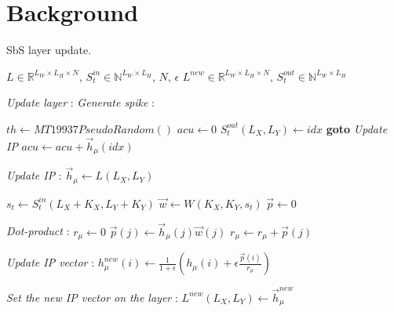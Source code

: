 \section{Background}
\label{sec:background}



\begin{algorithm}
\caption{SbS layer update.}

\begin{algorithmic}[1]
	\SetAlgoLined
	\renewcommand{\algorithmicrequire}{\textbf{input:}}
	\renewcommand{\algorithmicensure}{\textbf{output:}}
	\REQUIRE $L\in\mathbb{R}^{L_W \times L_H \times N}$, $S_t^{in}\in\mathbb{N}^{ L_W \times L_H}$, $N$, $\epsilon$
	\ENSURE $L^{new}\in\mathbb{R}^{L_W\times L_H \times N}$, $S_t^{out} \in\mathbb{N}^{L_W\times L_H}$
	
	\textit{Update layer} :
		\textit{Generate spike} :
		
		\STATE $th \leftarrow MT19937PseudoRandom()$
		\STATE $acu \leftarrow 0$
				\STATE $S_t^{out}(L_X,L_Y) \leftarrow idx$
				\STATE \textbf{goto} \emph{Update IP}
			\ENDIF
			\STATE $acu \leftarrow acu + \vec{h}_{\mu}(idx)$
		\ENDFOR

		\textit{Update IP} :
		\STATE $\vec{h}_\mu \leftarrow L(L_X,L_Y)$ 
		
			\STATE $s_t \leftarrow S_t^{in}(L_X+K_X,L_Y+K_Y)$
			\STATE $\vec{w} \leftarrow W(K_X,K_Y,s_t)$
			\STATE $\vec{p} \leftarrow 0$
			
			\textit{Dot-product} :
			\STATE $r_{\mu} \leftarrow 0$
				\STATE $\vec{p}(j) \leftarrow \vec{h}_{\mu}(j)\vec{w}(j)$
				\STATE $r_{\mu} \leftarrow r_{\mu} + \vec{p}(j)$
			\ENDFOR
			
			
				\textit{Update IP vector} :
				\STATE
				$  h_\mu^{new}(i) \leftarrow \frac{1}{1+\epsilon} \left(h_\mu(i) + \epsilon \frac{\vec{p}(i) }{r_{\mu}} \right) $
				\ENDFOR

				\textit{Set the new IP vector on the layer} :
				\STATE $L^{new}(L_X,L_Y) \leftarrow \vec{h}_\mu^{new}$
			\ENDIF
		\ENDFOR
	\ENDFOR
	
\end{algorithmic} 
\end{algorithm}

